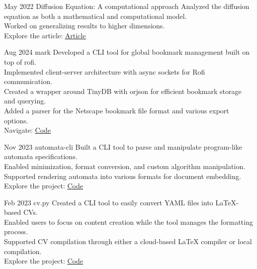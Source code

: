 \documentclass[hidelinks]{report}
\begin{document}
\newpage

\entry
    {May 2022}
    {Diffusion Equation: A computational approach}  
    {} 
    {}
    {
        \textbullet Analyzed the diffusion equation as both a mathematical and computational model.\\
        \textbullet Worked on generalizing results to higher dimensions.\\
        \textbullet Explore the article: \href{\blog/diffusion}{\underline{Article}}
    }

\vspace{2mm}


\entry
    {Aug 2024}
    {mark}
    {} {}
    {
    \textbullet Developed a CLI tool for global bookmark management built on top of rofi.\\ 
    \textbullet Implemented client-server architecture with async sockets for Rofi communication.\\
    \textbullet Created a wrapper around TinyDB with orjson for efficient bookmark storage and querying.\\ 
    \textbullet Added a parser for the Netscape bookmark file format and various export options.\\
    \textbullet Navigate: \href{\github/mark}{\underline{Code}}
    }

\entry
    {Nov 2023}
    {automata-cli}
    {} {}
    {
    \textbullet Built a CLI tool to parse and manipulate program-like automata specifications. \\ 
    \textbullet Enabled minimization, format conversion, and custom algorithm manipulation. \\ 
    \textbullet Supported rendering automata into various formats for document embedding.\\
    \textbullet Explore the project: \href{\github/automata-cli}{\underline{Code}}
    }

\entry
    {Feb 2023}
    {cv.py}
    {} {}  
    {
    \textbullet Created a CLI tool to easily convert YAML files into LaTeX-based CVs.\\
    \textbullet Enabled users to focus on content creation while the tool manages the formatting process.\\
    \textbullet Supported CV compilation through either a cloud-based LaTeX compiler or local compilation.\\
    \textbullet Explore the project: \href{\github/CV.py}{\underline{Code}}
    }
\end{document}
